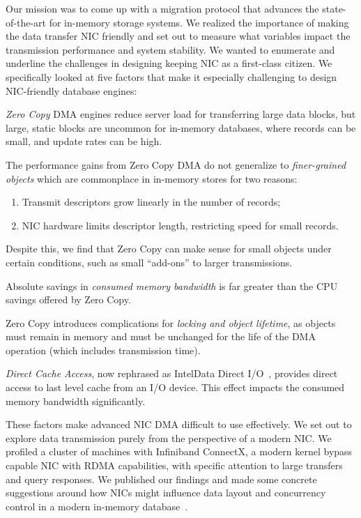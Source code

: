 Our mission was to come up with a migration protocol that advances the state-of-the-art for in-memory storage systems.
We realized the importance of making the data transfer NIC friendly and set out to measure what variables impact the 
transmission performance and system stability. We wanted to enumerate and underline the challenges in designing keeping NIC as a first-class citizen.
We specifically looked at five factors that make it especially challenging to design NIC-friendly
database engines:
\begin{myitemize}
  \item {\em Zero Copy} DMA engines reduce server load for transferring large data
    blocks, but large, static blocks are uncommon for in-memory databases,
    where records can be small, and update rates can be high.
  \item The performance gains from Zero Copy DMA do not generalize to
      {\em finer-grained objects} which are commonplace in in-memory stores for two reasons:
      \begin{enumerate}
        \item Transmit descriptors grow linearly in the number of records;
        \item NIC hardware limits descriptor length, restricting speed for small records.
      \end{enumerate}
      Despite this, we find that Zero Copy can make sense for small objects under certain conditions, such as
      small ``add-ons'' to larger transmissions.
   \item Absolute savings in {\em consumed memory bandwidth} is far greater than the CPU savings 
       offered by Zero Copy.
   \item Zero Copy introduces complications for \emph{locking and object
      lifetime}, as objects must remain in memory and must be
      unchanged for the life of the DMA operation (which includes transmission
      time).
  \item {\em Direct Cache Access}, now rephrased as Intel\textregistered Data Direct I/O~\cite{ddio},
      provides direct access to last level cache from an I/O device. This effect
      impacts the consumed memory bandwidth significantly.
\end{myitemize}


These factors make advanced NIC DMA difficult to use effectively. We set out to explore data 
transmission purely from the perspective of a modern NIC. We profiled a cluster of machines with
Infiniband ConnectX, a modern kernel bypass capable NIC
with RDMA capabilities, with specific attention to large transfers and query responses.
We published our findings and made some concrete suggestions around how NICs might
influence data layout and concurrency control in a modern in-memory 
database~\cite{imdmpaper}. 

